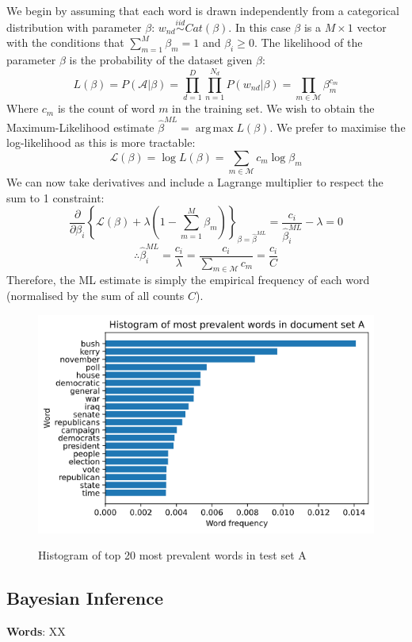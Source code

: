 \documentclass[]{article}
\DeclareMathOperator*{\argmax}{arg\,max}
\newcommand{\Acal}{\mathcal{A}}
\newcommand{\Lcal}{\mathcal{L}}
\newcommand{\Mcal}{\mathcal{M}}
\newcommand{\iid}{\stackrel{iid}{\sim}}
\newcommand{\figwidth}{0.6\linewidth}
\newcommand{\betaml}{\hat{\beta}^{ML}}
\begin{document}
We begin by assuming that each word is drawn independently from a categorical distribution with parameter $\beta$: $w_{nd} \iid Cat(\beta)$. In this case $\beta$ is a $M \times 1$ vector with the conditions that $\sum_{m=1}^{M} \beta_m = 1$ and $\beta_i \geq 0$. The likelihood of the parameter $\beta$ is the probability of the dataset given $\beta$:
%
\begin{equation}
	L(\beta) = P(\Acal | \beta) = \prod_{d=1}^{D} \prod_{n=1}^{N_d} P(w_{nd} | \beta) = \prod_{m \in \Mcal} \beta_m ^{c_m}
\end{equation}
%
Where $c_m$ is the count of word $m$ in the training set. We wish to obtain the Maximum-Likelihood estimate $\betaml = \argmax L(\beta)$. We prefer to maximise the log-likelihood as this is more tractable:
%
\begin{equation}
	\Lcal(\beta) = \log L(\beta) = \sum_{m \in \Mcal} c_m \log \beta_m
\end{equation}
%
We can now take derivatives and include a Lagrange multiplier to respect the sum to 1 constraint:
%
\begin{equation*}
	\frac{\partial}{\partial \beta_i}  \left\{ \Lcal(\beta) + \lambda \left(1 - \sum_{m=1}^{M} \beta_m \right) \right\}_{\beta = \betaml} = \frac{c_i}{\betaml_i} - \lambda= 0
\end{equation*}
\begin{equation}
	\therefore \betaml_i = \frac{c_i}{\lambda} = \frac{c_i}{\sum_{m \in \Mcal} c_m} = \frac{c_i}{C}
\end{equation}
%
Therefore, the ML estimate is simply the empirical frequency of each word (normalised by the sum of all counts $C$).
%
\begin{figure}[!h]
	\centering
	\includegraphics[width=\figwidth]{hist-ml.png}
	\label{fig:hist-ml}
	\caption{Histogram of top 20 most prevalent words in test set A}
\end{figure}
\subsection{Bayesian Inference}

\textbf{Words}: XX
\end{document}
